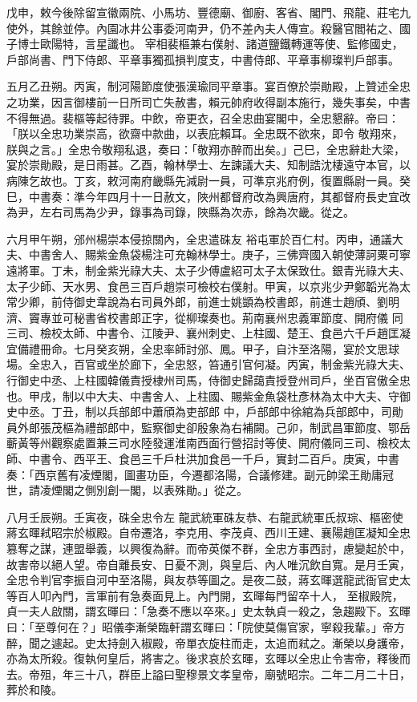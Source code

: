 \begin{pinyinscope}
 戊申，敕今後除留宣徽兩院、小馬坊、豐德廟、御廚、客省、閣門、飛龍、莊宅九使外，其餘並停。內園冰井公事委河南尹，仍不差內夫人傳宣。殺醫官閻祐之、國子博士歐陽特，言星讖也。
 宰相裴樞兼右僕射、諸道鹽鐵轉運等使、監修國史，戶部尚書、門下侍郎、平章事獨孤損判度支，中書侍郎、平章事柳璨判戶部事。



 五月乙丑朔。丙寅，制河陽節度使張漢瑜同平章事。宴百僚於崇勛殿，上贊述全忠之功業，因言御樓前一日所司亡失赦書，賴元帥府收得副本施行，幾失事矣，中書不得無過。裴樞等起待罪。中飲，帝更衣，召全忠曲宴閣中，全忠懇辭。帝曰：「朕以全忠功業崇高，欲齋中款曲，以表庇賴耳。全忠既不欲來，即令
 敬翔來，朕與之言。」全忠令敬翔私退，奏曰：「敬翔亦醉而出矣。」己巳，全忠辭赴大梁，宴於崇勛殿，是日雨甚。乙酉，翰林學士、左諫議大夫、知制誥沈棲遠守本官，以病陳乞故也。丁亥，敕河南府畿縣先減尉一員，可準京兆府例，復置縣尉一員。癸巳，中書奏：準今年四月十一日赦文，陜州都督府改為興唐府，其都督府長史宜改為尹，左右司馬為少尹，錄事為司錄，陜縣為次赤，餘為次畿。從之。



 六月甲午朔，邠州楊崇本侵掠關內，全忠遣硃友
 裕屯軍於百仁村。丙申，通議大夫、中書舍人、賜紫金魚袋楊注可充翰林學士。庚子，三佛齊國入朝使薄訶粟可寧遠將軍。丁未，制金紫光祿大夫、太子少傅盧紹可太子太保致仕。銀青光祿大夫、太子少師、天水男、食邑三百戶趙崇可檢校右僕射。甲寅，以京兆少尹鄭韜光為太常少卿，前侍御史韋說為右司員外郎，前進士姚顗為校書郎，前進士趙頎、劉明濟、竇專並可秘書省校書郎正字，從柳璨奏也。荊南襄州忠義軍節度、開府儀
 同三司、檢校太師、中書令、江陵尹、襄州刺史、上柱國、楚王、食邑六千戶趙匡凝宜備禮冊命。七月癸亥朔，全忠率師討邠、鳳。甲子，自汴至洛陽，宴於文思球場。全忠入，百官或坐於廊下，全忠怒，笞通引官何凝。丙寅，制金紫光祿大夫、行御史中丞、上柱國韓儀責授棣州司馬，侍御史歸藹責授登州司戶，坐百官傲全忠也。甲戌，制以中大夫、中書舍人、上柱國、賜紫金魚袋杜彥林為太中大夫、守御史中丞。丁丑，制以兵部郎中蕭頎為吏部郎
 中，戶部郎中徐綰為兵部郎中，司勛員外郎張茂樞為禮部郎中，監察御史卻殷象為右補闕。己卯，制武昌軍節度、鄂岳蘄黃等州觀察處置兼三司水陸發運淮南西面行營招討等使、開府儀同三司、檢校太師、中書令、西平王、食邑三千戶杜洪加食邑一千戶，實封二百戶。庚寅，中書奏：「西京舊有凌煙閣，圖畫功臣，今遷都洛陽，合議修建。副元帥梁王勛庸冠世，請凌煙閣之側別創一閣，以表殊勛。」從之。



 八月壬辰朔。壬寅夜，硃全忠令左
 龍武統軍硃友恭、右龍武統軍氏叔琮、樞密使蔣玄暉弒昭宗於椒殿。自帝遷洛，李克用、李茂貞、西川王建、襄陽趙匡凝知全忠篡奪之謀，連盟舉義，以興復為辭。而帝英傑不群，全忠方事西討，慮變起於中，故害帝以絕人望。帝自離長安、日憂不測，與皇后、內人唯沉飲自寬。是月壬寅，全忠令判官李振自河中至洛陽，與友恭等圖之。是夜二鼓，蔣玄暉選龍武衙官史太等百人叩內門，言軍前有急奏面見上。內門開，玄暉每門留卒十人，
 至椒殿院，貞一夫人啟關，謂玄暉曰：「急奏不應以卒來。」史太執貞一殺之，急趨殿下。玄暉曰：「至尊何在？」昭儀李漸榮臨軒謂玄暉曰：「院使莫傷官家，寧殺我輩。」帝方醉，聞之遽起。史太持劍入椒殿，帝單衣旋柱而走，太追而弒之。漸榮以身護帝，亦為太所殺。復執何皇后，將害之。後求哀於玄暉，玄暉以全忠止令害帝，釋後而去。帝殂，年三十八，群臣上謚曰聖穆景文孝皇帝，廟號昭宗。二年二月二十日，葬於和陵。



\end{pinyinscope}
